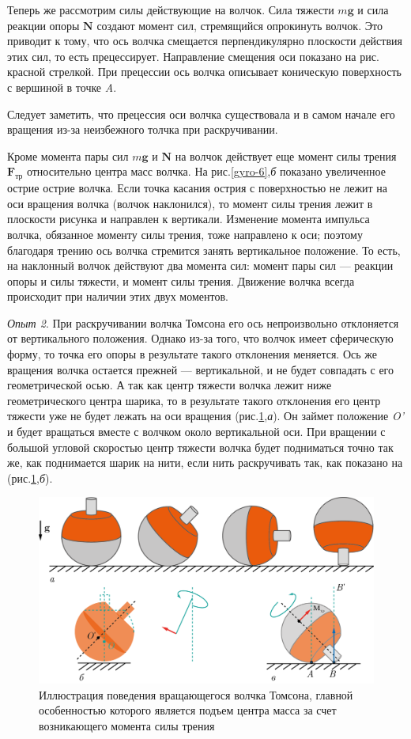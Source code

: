 \documentclass[14pt,a4paper,oneside]{extarticle}	%
\begin{document}
			Теперь же рассмотрим силы действующие на волчок.
			Сила тяжести $ m\textbf{g} $ и сила реакции опоры $ \textbf{N} $ создают момент сил, стремящийся опрокинуть волчок. Это приводит к тому, что ось волчка смещается перпендикулярно плоскости действия этих сил, то есть прецессирует.
			Направление смещения оси показано на рис. красной стрелкой.
			При прецессии ось волчка описывает коническую поверхность с вершиной в точке \textit{A}.
			
			Следует заметить, что прецессия оси волчка существовала и в самом начале его вращения из-за неизбежного толчка при раскручивании.
			
			Кроме момента пары сил  $ m\textbf{g} $ и $ \textbf{N} $  на волчок действует еще момент силы трения $ \textbf{F}_{\text{тр}} $ относительно центра масс волчка.
			На рис.\ref{gyro-6},\textit{б} показано увеличенное острие острие волчка. 
			Если точка касания острия с поверхностью не лежит на оси вращения волчка (волчок наклонился), то момент силы трения лежит в плоскости рисунка и направлен к вертикали. Изменение момента импульса волчка, обязанное моменту силы трения, тоже направлено к оси; поэтому благодаря трению ось волчка стремится занять вертикальное положение. 	
			То есть, на наклонный волчок действуют два момента сил: момент пары сил — реакции опоры и силы тяжести, и момент силы трения. Движение волчка всегда происходит при наличии этих двух моментов.
									
			\textit{Опыт 2}. При раскручивании волчка Томсона его ось непроизвольно отклоняется от вертикального положения.
			Однако из-за того, что волчок имеет сферическую форму, то точка его опоры в результате такого отклонения меняется.
			Ось же вращения волчка остается прежней — вертикальной, и не будет совпадать с его геометрической осью. 
			А так как центр тяжести волчка лежит ниже геометрического центра шарика, то в результате такого отклонения его центр тяжести уже не будет лежать на оси вращения (рис.\ref{gyro-7},\textit{а}).
			Он займет положение \textit{O'} и будет вращаться вместе с волчком около вертикальной оси.
			При вращении с большой угловой скоростью центр тяжести волчка будет подниматься точно так же, как поднимается шарик на нити, если нить раскручивать так, как показано на (рис.\ref{gyro-7},\textit{б}).	
				\begin{figure}[H] 	
					\centering 	
					\includegraphics[width=0.9\linewidth]{gyro-7.png}
					\caption{Иллюстрация поведения вращающегося волчка Томсона, главной особенностью которого является подъем центра масса за счет возникающего момента силы трения}
					\label{gyro-7}
				\end{figure}	
					
\end{document}
